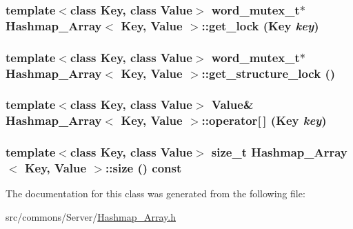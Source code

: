 \label{class_hashmap___array_a0397d0bf1b29c5e71341b4f0c85b5bf1}
\hypertarget{class_hashmap___array_a98060703f13d5182cb879a327cc06622}{
\subsubsection[{get\_\-lock}]{\setlength{\rightskip}{0pt plus 5cm}template$<$class Key, class Value$>$ word\_\-mutex\_\-t$\ast$ {\bf Hashmap\_\-Array}$<$ Key, Value $>$::get\_\-lock (Key {\em key})}}
\label{class_hashmap___array_a98060703f13d5182cb879a327cc06622}
\hypertarget{class_hashmap___array_adf8830a2535d8f3dd165ca6032204f51}{
\subsubsection[{get\_\-structure\_\-lock}]{\setlength{\rightskip}{0pt plus 5cm}template$<$class Key, class Value$>$ word\_\-mutex\_\-t$\ast$ {\bf Hashmap\_\-Array}$<$ Key, Value $>$::get\_\-structure\_\-lock ()}}
\label{class_hashmap___array_adf8830a2535d8f3dd165ca6032204f51}
\hypertarget{class_hashmap___array_a856e61ce8b5a9c3286a2af305df4bfe4}{
\subsubsection[{operator[]}]{\setlength{\rightskip}{0pt plus 5cm}template$<$class Key, class Value$>$ Value\& {\bf Hashmap\_\-Array}$<$ Key, Value $>$::operator\mbox{[}$\,$\mbox{]} (Key {\em key})}}
\label{class_hashmap___array_a856e61ce8b5a9c3286a2af305df4bfe4}
\hypertarget{class_hashmap___array_aa42f51c115eda16684ecf8b2fc25e121}{
\subsubsection[{size}]{\setlength{\rightskip}{0pt plus 5cm}template$<$class Key, class Value$>$ size\_\-t {\bf Hashmap\_\-Array}$<$ Key, Value $>$::size () const}}
\label{class_hashmap___array_aa42f51c115eda16684ecf8b2fc25e121}


The documentation for this class was generated from the following file:\begin{DoxyCompactItemize}
\item 
src/commons/Server/\hyperlink{_hashmap___array_8h}{Hashmap\_\-Array.h}\end{DoxyCompactItemize}

